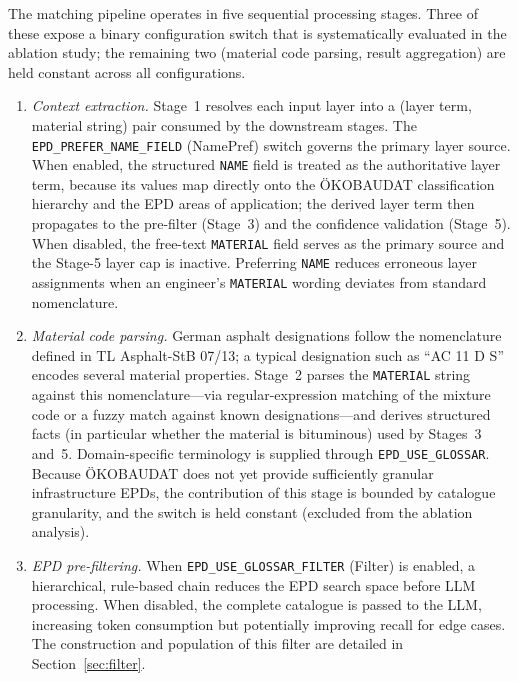 \documentclass[10pt, a4paper, twocolumn]{article}
\begin{document}

The matching pipeline operates in five sequential processing stages. Three of
these expose a binary configuration switch that is systematically evaluated in
the ablation study; the remaining two (material code parsing, result aggregation)
are held constant across all configurations.

\begin{enumerate}[leftmargin=*, itemsep=3pt, topsep=3pt, label=\arabic*.]

\item \textit{Context extraction.} Stage~1 resolves each input layer into a
(layer term, material string) pair consumed by the downstream stages. The
\texttt{EPD\_PREFER\_NAME\_FIELD} (NamePref) switch governs the primary layer
source. When enabled, the structured \texttt{NAME} field is treated as the
authoritative layer term, because its values map directly onto the
\"OKOBAUDAT classification hierarchy and the EPD areas of application; the
derived layer term then propagates to the pre-filter (Stage~3) and the
confidence validation (Stage~5). When disabled, the free-text \texttt{MATERIAL}
field serves as the primary source and the Stage-5 layer cap is inactive.
Preferring \texttt{NAME} reduces erroneous layer assignments when an engineer's
\texttt{MATERIAL} wording deviates from standard nomenclature.

\item \textit{Material code parsing.} German asphalt designations follow the
nomenclature defined in TL Asphalt-StB 07/13; a typical designation such as
``AC 11 D S'' encodes several material properties. Stage~2 parses the
\texttt{MATERIAL} string against this nomenclature---via regular-expression
matching of the mixture code or a fuzzy match against known designations---and
derives structured facts (in particular whether the material is bituminous) used
by Stages~3 and~5. Domain-specific terminology is supplied through
\texttt{EPD\_USE\_GLOSSAR}. Because \"OKOBAUDAT does not yet provide sufficiently
granular infrastructure EPDs, the contribution of this stage is bounded by
catalogue granularity, and the switch is held constant (excluded from the
ablation analysis).

\item \textit{EPD pre-filtering.} When \texttt{EPD\_USE\_GLOSSAR\_FILTER} (Filter)
is enabled, a hierarchical, rule-based chain reduces the EPD search space before
LLM processing. When disabled, the complete catalogue is passed to the LLM,
increasing token consumption but potentially improving recall for edge cases. The
construction and population of this filter are detailed in
Section~\ref{sec:filter}.


\end{enumerate}
\end{document}
